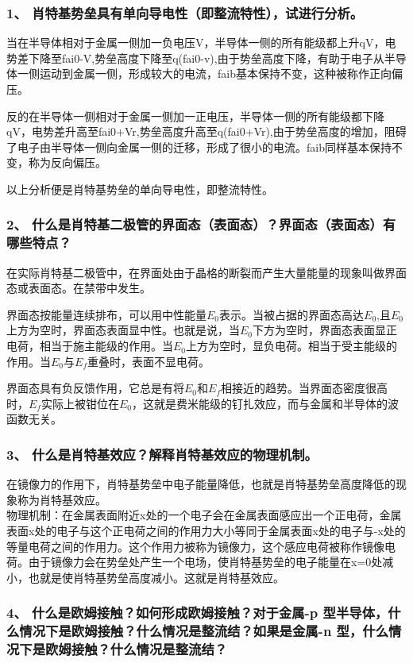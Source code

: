 \documentclass[cn,11pt]{elegantbook}
\begin{document}
\subsubsection*{1、 肖特基势垒具有单向导电性（即整流特性），试进行分析。}

当在半导体相对于金属一侧加一负电压V，半导体一侧的所有能级都上升qV，电势差下降至fai0-V,势垒高度下降至q(fai0-v),由于势垒高度下降，有助于电子从半导体一侧运动到金属一侧，形成较大的电流，faib基本保持不变，这种被称作正向偏压。

反的在半导体一侧相对于金属一侧加一正电压，半导体一侧的所有能级都下降qV，电势差升高至fai0+Vr,势垒高度升高至q(fai0+Vr),由于势垒高度的增加，阻碍了电子由半导体一侧向金属一侧的迁移，形成了很小的电流。faib同样基本保持不变，称为反向偏压。

以上分析便是肖特基势垒的单向导电性，即整流特性。
\subsubsection*{2、 什么是肖特基二极管的界面态（表面态）？界面态（表面态）有哪些特点？}

在实际肖特基二极管中，在界面处由于晶格的断裂而产生大量能量的现象叫做界面态或表面态。在禁带中发生。

界面态按能量连续排布，可以用中性能量$E_{0}$表示。当被占据的界面态高达$E_{0}$,且$E_{0}$上方为空时，界面态表面显中性。也就是说，当$E_{0}$下方为空时，界面态表面显正电荷，相当于施主能级的作用。当$E_{0}$上方为空时，显负电荷。相当于受主能级的作用。当$E_{0}$与$E_{f}$重叠时，表面不显电荷。

界面态具有负反馈作用，它总是有将$E_{0}$和$E_{f}$相接近的趋势。当界面态密度很高时，$E_{f}$实际上被钳位在$E_{0}$，这就是费米能级的钉扎效应，而与金属和半导体的波函数无关。
\subsubsection*{3、 什么是肖特基效应？解释肖特基效应的物理机制。}

在镜像力的作用下，肖特基势垒中电子能量降低，也就是肖特基势垒高度降低的现象称为肖特基效应。
\\物理机制：在金属表面附近x处的一个电子会在金属表面感应出一个正电荷，金属表面x处的电子与这个正电荷之间的作用力大小等同于金属表面x处的电子与-x处的等量电荷之间的作用力。这个作用力被称为镜像力，这个感应电荷被称作镜像电荷。由于镜像力会在势垒处产生一个电场，使肖特基势垒的电子能量在x=0处减小，也就是使肖特基势垒高度减小。这就是肖特基效应。

\subsubsection*{4、 什么是欧姆接触？如何形成欧姆接触？对于金属-p 型半导体，什么情况下是欧姆接触？什么情况是整流结？如果是金属-n 型，什么情况下是欧姆接触？什么情况是整流结？}
\end{document}
